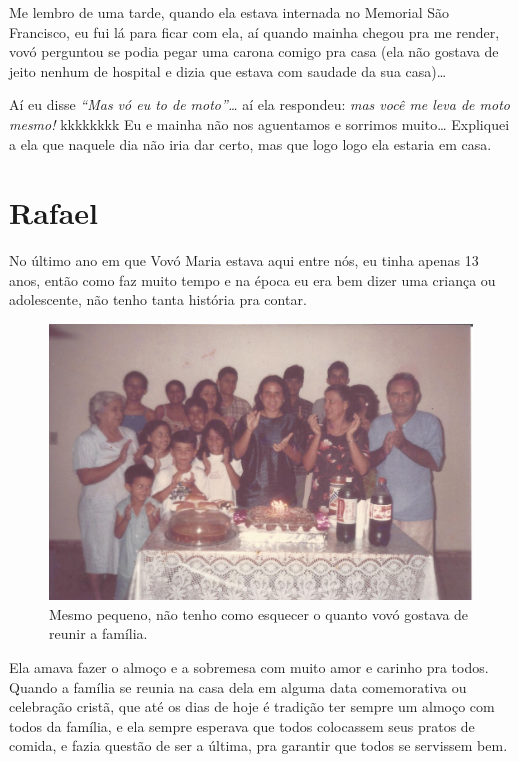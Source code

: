 \documentclass[
  brazil,
  a6paper,
  oneside,
  landscape,
  14pt]{scrbook}
\begin{document}
Me lembro de uma tarde, quando ela estava internada no Memorial São
Francisco, eu fui lá para ficar com ela, aí quando mainha chegou pra me
render, vovó perguntou se podia pegar uma carona comigo pra casa (ela
não gostava de jeito nenhum de hospital e dizia que estava com saudade
da sua casa)\ldots{}

Aí eu disse \emph{``Mas vó eu to de moto''\ldots{}} aí ela respondeu:
\emph{mas você me leva de moto mesmo!} kkkkkkkk Eu e mainha não nos
aguentamos e sorrimos muito\ldots{} Expliquei a ela que naquele dia não
iria dar certo, mas que logo logo ela estaria em casa.

\hypertarget{rafael}{%
\section{Rafael}\label{rafael}}

No último ano em que Vovó Maria estava aqui entre nós, eu tinha apenas
13 anos, então como faz muito tempo e na época eu era bem dizer uma
criança ou adolescente, não tenho tanta história pra contar.

\begin{figure}
\centering
\includegraphics{img/dudu/vovo-festa-rafael.png}
\caption{Mesmo pequeno, não tenho como esquecer o quanto vovó gostava de
reunir a família.}
\end{figure}

Ela amava fazer o almoço e a sobremesa com muito amor e carinho pra
todos. Quando a família se reunia na casa dela em alguma data
comemorativa ou celebração cristã, que até os dias de hoje é tradição
ter sempre um almoço com todos da família, e ela sempre esperava que
todos colocassem seus pratos de comida, e fazia questão de ser a última,
pra garantir que todos se servissem bem.
\end{document}
